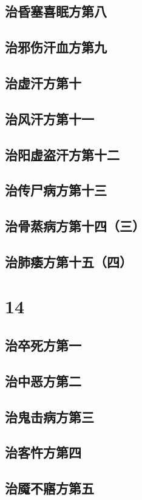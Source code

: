 \documentclass[a4paper,12pt,UTF8,twoside]{ctexbook}
\begin{document}
\chapter{治昏塞喜眠方第八}
\chapter{治邪伤汗血方第九}
\chapter{治虚汗方第十}
\chapter{治风汗方第十一}
\chapter{治阳虚盗汗方第十二}
\chapter{治传尸病方第十三}
\chapter{治骨蒸病方第十四（三）}
\chapter{治肺痿方第十五（四）}

\part{14}
\chapter{治卒死方第一}
\chapter{治中恶方第二}
\chapter{治鬼击病方第三}
\chapter{治客忤方第四}
\chapter{治魇不寤方第五}
\end{document}
